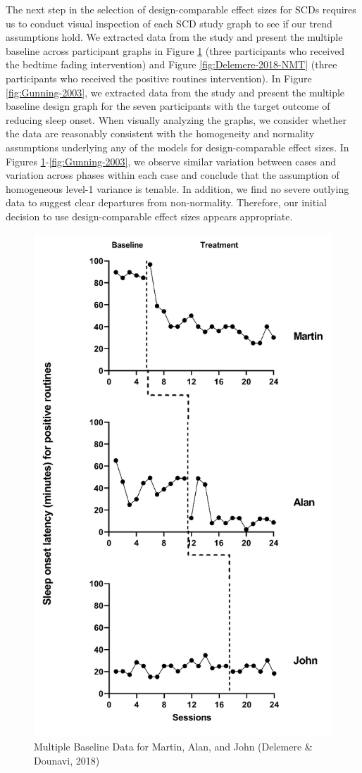\documentclass[
]{book}
\begin{document}
The next step in the selection of design-comparable effect sizes for SCDs requires us to conduct visual inspection of each SCD study graph to see if our trend assumptions hold. We extracted data from the \citet{delemere2018ParentImplemented} study and present the multiple baseline across participant graphs in Figure \ref{fig:Delemere-2018-MAJ} (three participants who received the bedtime fading intervention) and Figure \ref{fig:Delemere-2018-NMT} (three participants who received the positive routines intervention). In Figure \ref{fig:Gunning-2003}, we extracted data from the \citet{gunning2003Psychological} study and present the multiple baseline design graph for the seven participants with the target outcome of reducing sleep onset. When visually analyzing the graphs, we consider whether the data are reasonably consistent with the homogeneity and normality assumptions underlying any of the models for design-comparable effect sizes. In Figures \ref{fig:Delemere-2018-MAJ}-\ref{fig:Gunning-2003}, we observe similar variation between cases and variation across phases within each case and conclude that the assumption of homogeneous level-1 variance is tenable. In addition, we find no severe outlying data to suggest clear departures from non-normality. Therefore, our initial decision to use design-comparable effect sizes appears appropriate.

\begin{figure}
\includegraphics[width=0.6\linewidth]{images/DelemereDounavi2018_MartinAllenJohn} \caption{Multiple Baseline Data for Martin, Alan, and John (Delemere \& Dounavi, 2018)}\label{fig:Delemere-2018-MAJ}
\end{figure}
\end{document}
